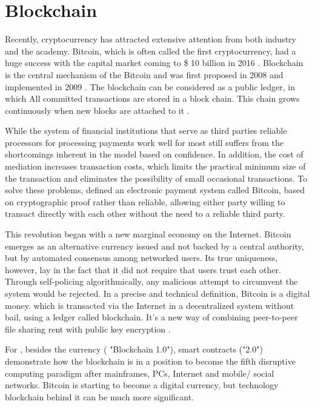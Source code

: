\section{Blockchain}
Recently, cryptocurrency has attracted extensive attention from both industry and the academy. Bitcoin, which is often called the first cryptocurrency, had a huge success with the capital market coming to \$ 10 billion in 2016 \cite{coindesk}. Blockchain is the central mechanism of the Bitcoin and was first proposed in 2008 and implemented in 2009 \cite{nakamoto2008bitcoin}. The blockchain can be considered as a public ledger, in which All committed transactions are stored in a block chain. This chain grows continuously when new blocks are attached to it \cite{zheng2016blockchain}.

While the system of financial institutions that serve as third parties reliable processors for processing payments work well for most still suffers from the shortcomings inherent in the model based on confidence. In addition, the cost of mediation increases transaction costs, which limits the practical minimum size of the transaction and eliminates the possibility of small occasional transactions. To solve these problems, \cite{nakamoto2008bitcoin} defined an electronic payment system called Bitcoin, based on cryptographic proof rather than reliable, allowing either party willing to transact directly with each other without the need to a reliable third party.

This revolution began with a new marginal economy on the Internet. Bitcoin emerges as an alternative currency issued and not backed by a central authority, but by automated consensus among networked users. Its true uniqueness, however, lay in the fact that it did not require that users trust each other. Through self-policing algorithmically, any malicious attempt to circumvent the system would be rejected. In a precise and technical definition, Bitcoin is a digital money. which is transacted via the Internet in a decentralized system without bail, using a ledger called blockchain. It's a new way of combining peer-to-peer file sharing rent with public key encryption \cite{swan2015blockchain}.

For \cite{swan2015blockchain}, besides the currency ( "Blockchain 1.0"), smart contracts ("2.0") demonstrate how the blockchain is in a position to become the fifth disruptive computing paradigm after mainframes, PCs, Internet and mobile/ social networks. Bitcoin is starting to become a digital currency, but technology blockchain behind it can be much more significant.

